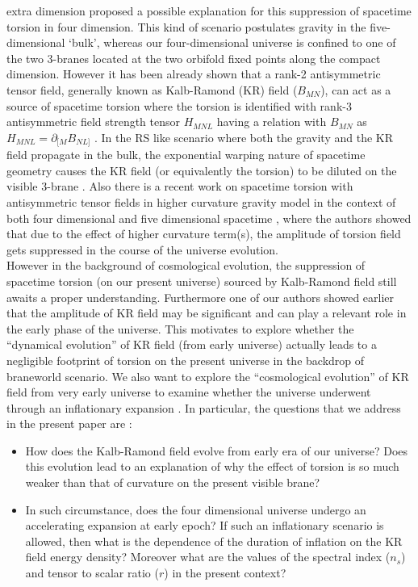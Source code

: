 \documentclass[a4paper]{article}
\begin{document}
extra dimension proposed a possible explanation for this suppression of spacetime torsion in four dimension. 
This kind of scenario postulates gravity in the five-dimensional ‘bulk’, 
whereas our four-dimensional universe is confined to one of the two 3-branes located at the two orbifold fixed 
points along the compact dimension. However it has been already shown that a rank-2 antisymmetric tensor field, generally known as 
Kalb-Ramond (KR) field ($B_{MN}$), can act as a source of spacetime torsion where the torsion is identified with rank-3 
antisymmetric field strength tensor $H_{MNL}$ having a relation with $B_{MN}$ as $H_{MNL}=\partial_{[M}B_{NL]}$ \cite{partha}. In the RS like 
scenario where both the gravity and the KR field propagate in the bulk, the exponential warping nature of spacetime geometry causes the 
KR field (or equivalently the torsion) to be diluted on the visible 3-brane \cite{ssg_prl,ashmita_ks,ashmita_prd,ashmita}. 
Also there is a recent work on spacetime torsion with 
antisymmetric tensor fields in higher curvature gravity model in the context of both four dimensional and five dimensional spacetime 
\cite{gomez}, where the authors showed that due to the effect of higher curvature term(s), 
the amplitude of torsion field gets suppressed in the course of the universe evolution.\\
However in the background of cosmological evolution, the suppression of spacetime torsion (on our present universe) 
sourced by Kalb-Ramond field still awaits a proper understanding. 
Furthermore one of our authors showed earlier that the amplitude of KR field may be significant and can play a relevant role 
in the early phase of the universe. This motivates to explore whether the ``dynamical evolution'' of KR field (from 
early universe) actually leads to a negligible footprint of torsion on the present universe in 
the backdrop of braneworld scenario. We also want to explore 
the ``cosmological evolution'' of KR field from very early universe to examine whether 
the universe underwent through an inflationary expansion \cite{guth,perkins, watson,linde,kinney,langlois,tp1,tp2}. 
In particular, the questions that we address in the present paper are :

\begin{itemize}
 \item How does the Kalb-Ramond field evolve from early era of our universe? Does this evolution lead 
 to an explanation of why the effect of torsion is so much weaker than that of curvature on the present visible brane?
 
 \item In such circumstance, does the four dimensional universe undergo an accelerating expansion at early epoch? If such an inflationary 
 scenario is allowed, then what is the dependence of the duration of inflation on the KR field energy density? Moreover what are the 
 values of the spectral index ($n_s$) and tensor to scalar ratio ($r$) in the present context?
\end{itemize}
\end{document}

